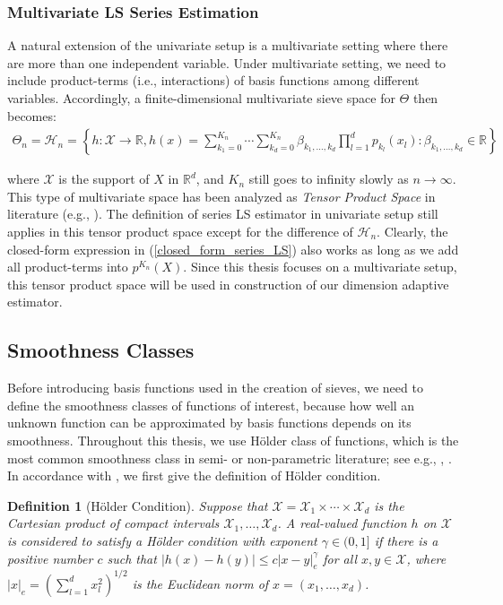 \documentclass[12pt, a4paper]{article}
\theoremstyle{MAstyle} \newtheorem{assumption}{Assumption}[section]
\theoremstyle{MAstyle} \newtheorem{definition}{Definition}[section]
\theoremstyle{MAstyle} \newtheorem{theorem}{Theorem}[section]
\theoremstyle{MAstyle} \newtheorem{corollary}{Corollary}[section]
\begin{document}
            \subsubsection{Multivariate LS Series Estimation}
            A natural extension of the univariate setup is a multivariate setting where there are more than one independent variable. Under multivariate setting, we need to include product-terms (i.e., interactions) of basis functions among different variables. Accordingly, a finite-dimensional multivariate sieve space for $\mathit{\Theta}$ then becomes:
            \begin{align}\label{sieve_space_multivariate}
                \mathit{\Theta_n}=\mathcal{H}_n=\left\{h: \mathcal{X} \rightarrow \mathbb{R}, h(x)=\sum_{k_1=0}^{K_n} \cdots \sum_{k_d=0}^{K_n} \beta_{k_1,\ldots,k_d}\prod_{l=1}^{d}p_{k_l}(x_l):\beta_{k_1,\ldots,k_d} \in \mathbb{R}\right\}
            \end{align}

            where $\mathcal{X}$ is the support of $X$ in $\mathbb{R}^d$, and $K_n$ still goes to infinity slowly as $n \to \infty$. This type of multivariate space has been analyzed as \textit{Tensor Product Space} in literature (e.g., \cite{Lin_2000, Zhang_Simon_2022}). The definition of series LS estimator in univariate setup still applies in this tensor product space except for the difference of $\mathcal{H}_n$. Clearly, the closed-form expression in (\ref{closed_form_series_LS}) also works as long as we add all product-terms into $p^{K_n}(X)$. Since this thesis focuses on a multivariate setup, this tensor product space will be used in construction of our dimension adaptive estimator.

        \subsection{Smoothness Classes}\label{smoothness_classes}

        Before introducing basis functions used in the creation of sieves, we need to define the smoothness classes of functions of interest, because how well an unknown function can be approximated by basis functions depends on its smoothness. Throughout this thesis, we use Hölder class of functions, which is the most common smoothness class in semi- or non-parametric literature; see e.g., \cite{Newey_1997}, \cite{Horowitz_1998}. In accordance with \cite{Chen_2007}, we first give the definition of Hölder condition.

        \begin{definition}[Hölder Condition]\label{hölder_condition}
            Suppose that $\mathcal{X}=\mathcal{X}_1 \times \cdots \times \mathcal{X}_d$ is the Cartesian product of compact intervals $\mathcal{X}_1, \ldots, \mathcal{X}_d$. A real-valued function $h$ on $\mathcal{X}$ is considered to satisfy a Hölder condition with exponent $\gamma \in (0,1]$ if there is a positive number $c$ such that $|h(x)-h(y)| \le c|x-y|_e^{\gamma}$ for all $x,y \in \mathcal{X}$, where $|x|_e=(\sum_{l=1}^d x_l^2)^{1/2}$ is the Euclidean norm of $x=(x_1,\ldots,x_d)$. 
        \end{definition}
\end{document}

